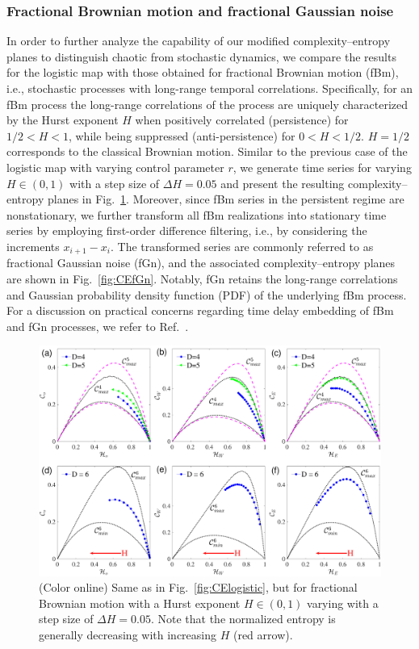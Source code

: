 \documentclass[aip,cha,reprint,nofootinbib]{revtex4-1}
\begin{document}
\subsubsection{Fractional Brownian motion and fractional Gaussian noise}
In order to further analyze the capability of our modified complexity--entropy planes to distinguish chaotic from stochastic dynamics, we compare the results for the logistic map with those obtained for fractional Brownian motion (fBm), i.e., stochastic processes with long-range temporal correlations. Specifically, for an fBm process the long-range correlations of the process are uniquely characterized by the Hurst exponent $H$ when positively correlated (persistence) for $1/2 < H < 1$, while being suppressed (anti-persistence) for $0< H < 1/2$. $H=1/2$ corresponds to the classical Brownian motion. Similar to the previous case of the logistic map with varying control parameter $r$, we generate time series for varying $H \in (0, 1)$ with a step size of $\Delta H=0.05$ and present the resulting complexity--entropy planes in Fig.~\ref{fig:CEfBm}. Moreover, since fBm series in the persistent regime are nonstationary, we further transform all fBm realizations into stationary time series by employing first-order difference filtering, i.e., by considering the increments $x_{i+1}- x_i$. The transformed series are commonly referred to as fractional Gaussian noise (fGn), and the associated complexity--entropy planes are shown in Fig.~\ref{fig:CEfGn}. Notably, fGn retains the long-range correlations and Gaussian probability density function (PDF) of the underlying fBm process. For a discussion on practical concerns regarding time delay embedding of fBm and fGn processes, we refer to Ref.~\cite{Zou2015}. 
\begin{figure}
	\centering 
	\includegraphics[width=2\columnwidth]{CompEntropy_fBm.pdf}
\caption{\small{(Color online) Same as in Fig.~\ref{fig:CElogistic}, but for fractional Brownian motion with a Hurst exponent $H \in (0, 1)$ varying with a step size of $\Delta H=0.05$. Note that the normalized entropy is generally decreasing with increasing $H$ (red arrow).}  \label{fig:CEfBm}}
\end{figure}
\end{document}

